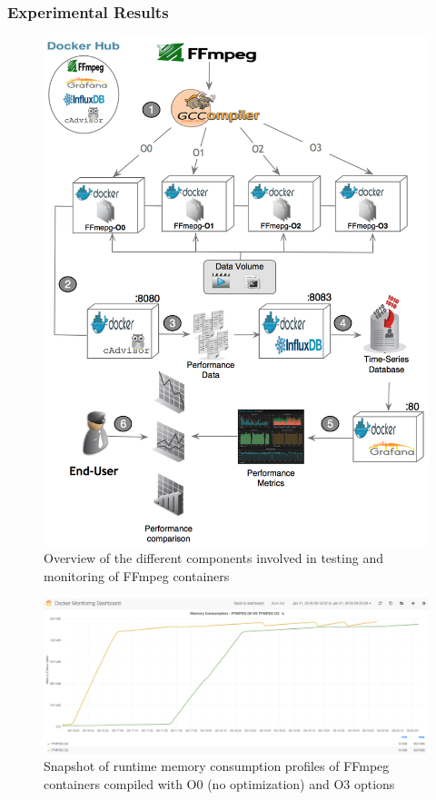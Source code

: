 \subsubsection{Experimental Results}
\begin{figure}[!t]
	\centering
	\includegraphics[width=1.\linewidth]{Ressources/infra_ffmpeg.png}
	\caption{Overview of the different components involved in testing and monitoring of FFmpeg containers}
\end{figure}


\begin{figure}[tbh]
	\includegraphics[width=1\linewidth]{Ressources/infra_stats.png}
	\caption{Snapshot of runtime memory consumption profiles of FFmpeg containers compiled with O0 (no optimization) and O3 options}
\end{figure}

